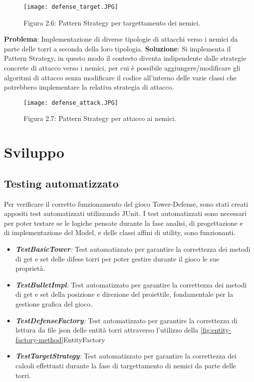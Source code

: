 \documentclass[a4paper,12pt]{report}
\begin{document}
\begin{figure}[H]
    \centering
    \texttt{[image: defense\_target.JPG]}
    \caption{Figura 2.6: Pattern Strategy per targettamento dei nemici.}
    \label{fig:defense_target}
\end{figure}



\textbf{Problema}:
Implementazione di diverse tipologie di attacchi verso i nemici da parte delle torri a seconda della loro tipologia.
\textbf{Soluzione}:
Si implementa il Pattern Strategy, in questo modo il contesto diventa indipendente dalle strategie concrete di attacco verso i nemici, per cui è possibile aggiungere/modificare gli algoritmi di attacco senza modificare il codice all'interno delle varie classi che potrebbero implementare la relativa strategia di attacco.

\begin{figure}[H]
    \centering
    \texttt{[image: defense\_attack.JPG]}
    \caption{Figura 2.7: Pattern Strategy per attacco ai nemici.}
    \label{fig:defense_attack}
\end{figure}


\chapter{Sviluppo}
\section{Testing automatizzato}
Per verificare il corretto funzionamento del gioco Tower-Defense, sono stati creati appositi test automatizzati utilizzando JUnit. 
I test automatizzati sono necessari per poter testare se le logiche pensate durante la fase analisi, di progettazione e di implementazione del Model, e delle classi affini di utility, sono funzionanti.

\begin{itemize}
    \item \textit{\textbf{TestBasicTower}:} Test automatizzato per garantire la correttezza dei metodi di get e set delle difese torri per poter gestire durante il gioco le sue proprietà.
    \item \textit{\textbf{TestBulletImpl}:} Test automatizzato per garantire la correttezza dei metodi di get e set della posizione e direzione del proiettile, fondamentale per la gestione grafica del gioco.
    \item \textit{\textbf{TestDefenseFactory}:} Test automatizzato per garantire la correttezza di lettura da file json delle entità torri attraverso l'utilizzo della \ref{fig:entity-factory-method}EntityFactory
    \item \textit{\textbf{TestTargetStrategy}:} Test automatizzato per garantire la correttezza dei calcoli effettuati durante la fase di targettamento di nemici da parte delle torri.
\end{itemize}
\end{document}
